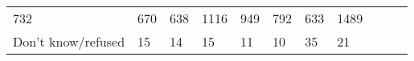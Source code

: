 \documentclass[]{article}
\begin{document}
\begin{longtable}[]{@{}lllllllllll@{}}
\begin{minipage}[t]{0.05\columnwidth}
732\strut
\end{minipage} & \begin{minipage}[t]{0.05\columnwidth}\raggedright\strut
670\strut
\end{minipage} & \begin{minipage}[t]{0.05\columnwidth}\raggedright\strut
638\strut
\end{minipage} & \begin{minipage}[t]{0.05\columnwidth}\raggedright\strut
1116\strut
\end{minipage} & \begin{minipage}[t]{0.06\columnwidth}\raggedright\strut
949\strut
\end{minipage} & \begin{minipage}[t]{0.06\columnwidth}\raggedright\strut
792\strut
\end{minipage} & \begin{minipage}[t]{0.04\columnwidth}\raggedright\strut
633\strut
\end{minipage} & \begin{minipage}[t]{0.11\columnwidth}\raggedright\strut
1489\strut
\end{minipage}\tabularnewline
\begin{minipage}[t]{0.14\columnwidth}\raggedright\strut
Don't know/refused\strut
\end{minipage} & \begin{minipage}[t]{0.04\columnwidth}\raggedright\strut
15\strut
\end{minipage} & \begin{minipage}[t]{0.05\columnwidth}\raggedright\strut
14\strut
\end{minipage} & \begin{minipage}[t]{0.05\columnwidth}\raggedright\strut
15\strut
\end{minipage} & \begin{minipage}[t]{0.05\columnwidth}\raggedright\strut
11\strut
\end{minipage} & \begin{minipage}[t]{0.05\columnwidth}\raggedright\strut
10\strut
\end{minipage} & \begin{minipage}[t]{0.05\columnwidth}\raggedright\strut
35\strut
\end{minipage} & \begin{minipage}[t]{0.06\columnwidth}\raggedright\strut
21\strut
\end{minipage} & \begin{minipage}[t]{0.06\columnwidth}\raggedright\strut

\end{minipage}
\end{longtable}
\end{document}
